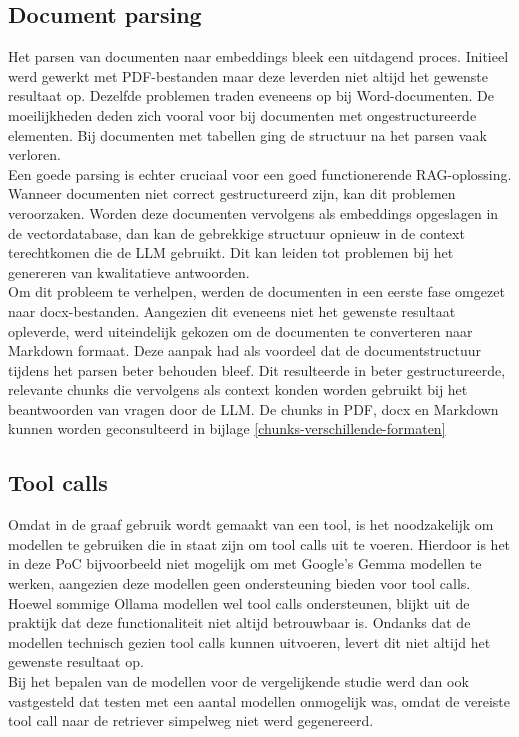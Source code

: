 \subsection{Document parsing}
Het parsen van documenten naar embeddings bleek een uitdagend proces. Initieel werd gewerkt met PDF-bestanden maar deze leverden niet altijd het gewenste resultaat op. Dezelfde problemen traden eveneens op bij Word-documenten. De moeilijkheden deden zich vooral voor bij documenten met ongestructureerde elementen. Bij documenten met tabellen ging de structuur na het parsen vaak verloren.
\\[1em]
Een goede parsing is echter cruciaal voor een goed functionerende RAG-oplossing. Wanneer documenten niet correct gestructureerd zijn, kan dit problemen veroorzaken. Worden deze documenten vervolgens als embeddings opgeslagen in de vectordatabase, dan kan de gebrekkige structuur opnieuw in de context terechtkomen die de LLM gebruikt. Dit kan leiden tot problemen bij het genereren van kwalitatieve antwoorden.
\\[1em]
Om dit probleem te verhelpen, werden de documenten in een eerste fase omgezet naar docx-bestanden. Aangezien dit eveneens niet het gewenste resultaat opleverde, werd uiteindelijk gekozen om de documenten te converteren naar Markdown formaat. Deze aanpak had als voordeel dat de documentstructuur tijdens het parsen beter behouden bleef. Dit resulteerde in beter gestructureerde, relevante chunks die vervolgens als context konden worden gebruikt bij het beantwoorden van vragen door de LLM. De chunks in PDF, docx en Markdown kunnen worden geconsulteerd in bijlage \ref{chunks-verschillende-formaten}

\subsection{Tool calls}
\label{tool-calls}

Omdat in de graaf gebruik wordt gemaakt van een tool, is het noodzakelijk om modellen te gebruiken die in staat zijn om tool calls uit te voeren. Hierdoor is het in deze PoC bijvoorbeeld niet mogelijk om met Google's Gemma modellen te werken, aangezien deze modellen geen ondersteuning bieden voor tool calls.
\\[1em]
Hoewel sommige Ollama modellen wel tool calls ondersteunen, blijkt uit de praktijk dat deze functionaliteit niet altijd betrouwbaar is. Ondanks dat de modellen technisch gezien tool calls kunnen uitvoeren, levert dit niet altijd het gewenste resultaat op.
\\[1em]
Bij het bepalen van de modellen voor de vergelijkende studie werd dan ook vastgesteld dat testen met een aantal modellen onmogelijk was, omdat de vereiste tool call naar de retriever simpelweg niet werd gegenereerd. 

